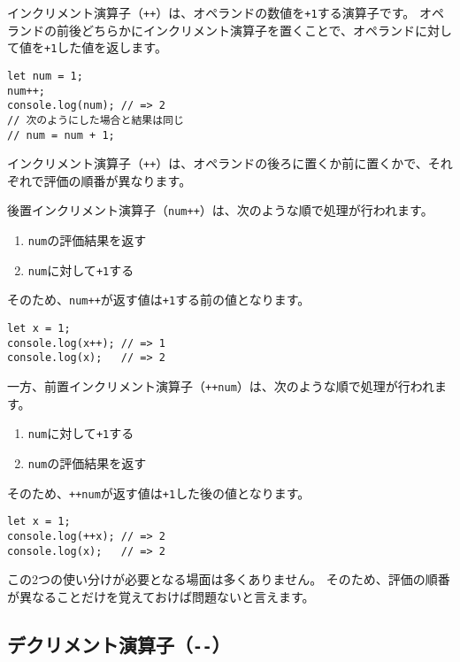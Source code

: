 インクリメント演算子（\texttt{++}）は、オペランドの数値を\texttt{+1}する演算子です。
オペランドの前後どちらかにインクリメント演算子を置くことで、オペランドに対して値を\texttt{+1}した値を返します。

\begin{lstlisting}
let num = 1;
num++;
console.log(num); // => 2
// 次のようにした場合と結果は同じ
// num = num + 1;
\end{lstlisting}

インクリメント演算子（\texttt{++}）は、オペランドの後ろに置くか前に置くかで、それぞれで評価の順番が異なります。

後置インクリメント演算子（\texttt{num++}）は、次のような順で処理が行われます。

\begin{enumerate}
\def\labelenumi{\arabic{enumi}.}
\item
  \texttt{num}の評価結果を返す
\item
  \texttt{num}に対して\texttt{+1}する
\end{enumerate}

そのため、\texttt{num++}が返す値は\texttt{+1}する前の値となります。

\begin{lstlisting}
let x = 1;
console.log(x++); // => 1
console.log(x);   // => 2
\end{lstlisting}

一方、前置インクリメント演算子（\texttt{++num}）は、次のような順で処理が行われます。

\begin{enumerate}
\def\labelenumi{\arabic{enumi}.}
\item
  \texttt{num}に対して\texttt{+1}する
\item
  \texttt{num}の評価結果を返す
\end{enumerate}

そのため、\texttt{++num}が返す値は\texttt{+1}した後の値となります。

\begin{lstlisting}
let x = 1;
console.log(++x); // => 2
console.log(x);   // => 2
\end{lstlisting}

この2つの使い分けが必要となる場面は多くありません。
そのため、評価の順番が異なることだけを覚えておけば問題ないと言えます。

\hypertarget{decrement-operator}{%
\subsection{\texorpdfstring{デクリメント演算子（\texttt{-\/-}）}{デクリメント演算子（-\/-）}}\label{decrement-operator}}

